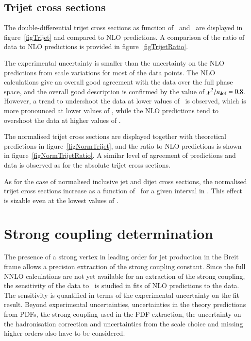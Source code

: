\documentclass[12pt]{article}
\begin{document}
\subsection{Trijet cross sections}
\label{sec:3jets}
The double-differential trijet cross sections as function of \meanpttri\ and \Qsq\ 
are displayed in figure~\ref{figTrijet} and compared to NLO predictions.
A comparison of the ratio of data to NLO predictions is provided in figure~\ref{figTrijetRatio}.

The experimental uncertainty is smaller than the uncertainty on the NLO predictions from scale variations for most of the data points.
The NLO calculations give an overall good agreement with the data over the full phase space, and the overall good description is confirmed by the value of $\chisq/\ndf=0.8$.
However, a trend to undershoot the data at lower values of \meanpttri\ is observed, which is
more pronounced at lower values of \Qsq, while the NLO predictions tend to overshoot the data at higher values of \meanpttri.

The normalised trijet cross sections are displayed together with theoretical predictions
in figure~\ref{figNormTrijet}, and the ratio to NLO predictions is shown in figure~\ref{figNormTrijetRatio}. 
A similar level of agreement of predictions and data is observed as for the absolute trijet cross sections.

As for the case of normalised inclusive jet and dijet cross sections, 
the normalised trijet cross sections increase  as a function of \Qsq\ for a given interval in \meanpttri.
This effect is sizable even at the lowest values of \meanpttri.



\section{Strong coupling determination}
\label{sec:alphas}
The presence of a strong vertex in leading order for jet production in the Breit frame allows a precision extraction of the strong coupling constant.
Since the full NNLO calculations are not yet available for an extraction of the strong coupling,
the sensitivity of the data to \asmz\ is studied in fits of NLO predictions to the data.
The sensitivity is quantified in terms of the experimental uncertainty on the fit result.
Beyond experimental uncertainties, uncertainties in the theory predictions from PDFs, the strong coupling used in the PDF extraction, the uncertainty on the hadronisation correction and uncertainties from the scale choice and missing higher orders also have to be considered.
\end{document}
